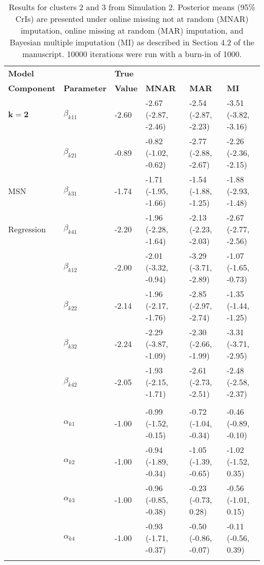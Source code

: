 \documentclass[useAMS,11pt]{article}
\newcommand{\1}{\mathbbm{1}}
\begin{document}
\begin{table}[t]
\caption{\label{tab:sim2} Results for clusters 2 and 3 from Simulation 2. Posterior means (95\% CrIs) are presented under online missing not at random (MNAR) imputation, online missing at random (MAR) imputation, and Bayesian multiple imputation (MI) as described in Section 4.2 of the manuscript. 10000 iterations were run with a burn-in of 1000.}
\begin{center}
\begin{tabular}{llllll}
\toprule
\textbf{Model} & & \textbf{True} & & & \\
\textbf{Component} & \textbf{Parameter} & \textbf{Value} & \textbf{MNAR} & \textbf{MAR} & \textbf{MI}\\
\midrule
$\boldsymbol{k = 2}$ & $\beta_{k11}$ & -2.60 & -2.67 (-2.87, -2.46) & -2.54 (-2.87, -2.23) & -3.51 (-3.82, -3.16)\\
 & $\beta_{k21}$ & -0.89 & -0.82 (-1.02, -0.62) & -2.77 (-2.88, -2.67) & -2.26 (-2.36, -2.15)\\
MSN & $\beta_{k31}$ & -1.74 & -1.71 (-1.95, -1.66) & -1.54 (-1.88, -1.25) &-1.88 (-2.93, -1.48)\\
Regression & $\beta_{k41}$ & -2.20 & -1.96 (-2.28, -1.64) & -2.13 (-2.23, -2.03) & -2.67 (-2.77, -2.56)\\
& $\beta_{k12}$ & -2.00 & -2.01 (-3.32, -0.94) & -3.29 (-3.71, -2.89) & -1.07 (-1.65, -0.73)\\
& $\beta_{k22}$ & -2.14 & -1.96 (-2.17, -1.76) & -2.85 (-2.97, -2.74) & -1.35 (-1.44, -1.25)\\
& $\beta_{k32}$ & -2.24 & -2.29 (-3.87, -1.09) & -2.30 (-2.66, -1.99) & -3.31 (-3.71, -2.95)\\
& $\beta_{k42}$ & -2.05 & -1.93 (-2.15, -1.71) & -2.61 (-2.73, -2.51) & -2.48 (-2.58, -2.37)\\
\addlinespace[0.2em]
\multicolumn{5}{l}{\textbf{ }}\\
& $\alpha_{k1}$ & -1.00 & -0.99 (-1.52, -0.15) & -0.72 (-1.04, -0.34) & -0.46 (-0.89, -0.10)\\
& $\alpha_{k2}$ & -1.00 & -0.94 (-1.89, -0.34) & -1.05 (-1.39, -0.65) & -1.02 (-1.52, 0.35)\\
& $\alpha_{k3}$ & -1.00 & -0.96 (-0.85, -0.38) & -0.23 (-0.73, 0.28) & -0.56 (-1.01, 0.15)\\
& $\alpha_{k4}$ & -1.00 & -0.93 (-1.71, -0.37) & -0.50 (-0.86, -0.07) & -0.11 (-0.56, 0.39)\\
\addlinespace[0.2em]
\multicolumn{5}{l}{\textbf{ }}\\

\end{tabular}
\end{center}
\end{table}
\end{document}
